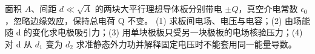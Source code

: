 面积 \(A\)、间距 \(d\ll\sqrt A\) 的两块大平行理想导体板分别带电 \(\pm Q\)，真空介电常数 \(\epsilon_0\)，忽略边缘效应，保持总电荷 Q 不变。
(1) 求板间电场、电压与电容；(2) 由场能随 d 的变化求电极吸引力；(3) 用单块极板只受另一块极板的电场核验压力；(4) 对 d 从 \(d_1\) 变为 \(d_2\) 求准静态外力功并解释固定电压时不能套用同一能量导数。
